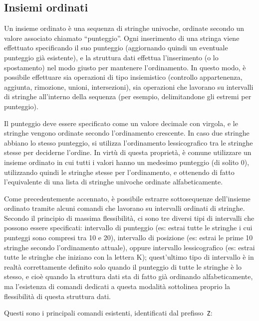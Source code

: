 \subsection{Insiemi ordinati}

Un insieme ordinato è una sequenza di stringhe univoche, ordinate secondo un valore associato
chiamato ``punteggio''. Ogni inserimento di una stringa viene effettuato specificando il suo
punteggio (aggiornando quindi un eventuale punteggio già esistente), e la struttura dati effettua
l'inserimento (o lo spostamento) nel modo giusto per mantenere l'ordinamento. In questo modo, è
possibile effettuare sia operazioni di tipo insiemistico (controllo appartenenza, aggiunta,
rimozione, unioni, intersezioni), sia operazioni che lavorano su intervalli di stringhe all'interno
della sequenza (per esempio, delimitandone gli estremi per punteggio).

Il punteggio deve essere specificato come un valore decimale con virgola, e le stringhe vengono
ordinate secondo l'ordinamento crescente. In caso due stringhe abbiano lo stesso punteggio, si
utilizza l'ordinamento lessicografico tra le stringhe stesse per deciderne l'ordine. In virtù di
questa proprietà, è comune utilizzare un insieme ordinato in cui tutti i valori hanno un medesimo
punteggio (di solito 0), utilizzando quindi le stringhe stesse per l'ordinamento, e ottenendo di
fatto l'equivalente di una lista di stringhe univoche ordinate alfabeticamente.

Come precedentemente accennato, è possibile estrarre sotto\-se\-quen\-ze dell'insieme ordinato tramite
alcuni comandi che lavorano su intervalli ordinati di stringhe. Secondo il principio di massima
flessibilità, ci sono tre diversi tipi di intervalli che possono essere specificati: intervallo di
punteggio (es: estrai tutte le stringhe i cui punteggi sono compresi tra 10 e 20), intervallo di
posizione (es: estrai le prime 10 stringhe secondo l'ordinamento attuale), oppure intervallo
lessicografico (es: estrai tutte le stringhe che iniziano con la lettera K); quest'ultimo tipo di
intervallo è in realtà correttamente definito solo quando il punteggio di tutte le stringhe è lo
stesso, e cioè quando la struttura dati sta di fatto già ordinando alfabeticamente, ma l'esistenza
di comandi dedicati a questa modalità sottolinea proprio la flessibilità di questa struttura dati.

Questi sono i principali comandi esistenti, identificati dal prefisso~\verb|Z|:

